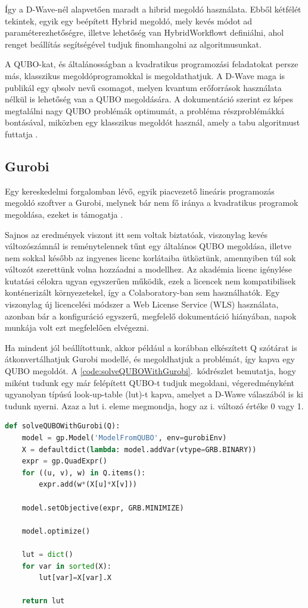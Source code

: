 Így a D-Wave-nél alapvetően maradt a hibrid megoldó használata. Ebből kétfélét tekintek, egyik egy beépített Hybrid megoldó, mely kevés módot ad paraméterezhetőségre, illetve lehetőség van HybridWorkflowt definiálni, ahol renget beállítás segítségével tudjuk finomhangolni az algoritmusunkat.


A QUBO-kat, és általánosságban a kvadratikus programozási feladatokat persze más, klasszikus megoldóprogramokkal is megoldathatjuk. A D-Wave maga is publikál egy qbsolv nevű csomagot, melyen kvantum erőforrások használata nélkül is lehetőség van a QUBO megoldására. A dokumentáció szerint ez képes megtalálni nagy QUBO problémák optimumát, a probléma részproblémákká bontásával, miközben egy klasszikus megoldót használ, amely a tabu algoritmust futtatja \cite{DWaveOceanQbsolv}. 

\subsection{Gurobi}\label{sec:Gurobi}

Egy kereskedelmi forgalomban lévő, egyik piacvezető lineáris programozás megoldó szoftver a Gurobi, melynek bár nem fő iránya a kvadratikus programok megoldása, ezeket is támogatja \cite{gurobi}. 

Sajnos az eredmények viszont itt sem voltak biztatóak, viszonylag kevés változószámnál is reménytelennek tűnt egy általános QUBO megoldása, illetve nem sokkal később az ingyenes licenc korlátaiba ütköztünk, amennyiben túl sok változót szerettünk volna hozzáadni a modellhez. Az akadémia licenc igénylése kutatási célokra ugyan egyszerűen működik, ezek a licencek nem kompatibilisek konténerizált környezetekel, így a Colaboratory-ban sem használhatók. Egy viszonylag új licencelési módszer a Web License Service (WLS) használata\cite{gurobiWLS}, azonban bár a konfiguráció egyszerű, megfelelő dokumentáció hiányában, napok munkája volt ezt megfelelően elvégezni\cite{gurobiAcademicColab}.

Ha mindent jól beállítottunk, akkor például a korábban elkészített Q szótárat is átkonvertálhatjuk Gurobi modellé, és megoldhatjuk a problémát, így kapva egy QUBO megoldót. A \ref{code:solveQUBOWithGurobi}.~kódrészlet bemutatja, hogy miként tudunk egy már felépített QUBO-t tudjuk megoldani, végeredményként ugyanolyan típúsú look-up-table (lut)-t kapva, amelyet a D-Wawe válaszából is ki tudunk nyerni. Azaz a lut i. eleme megmondja, hogy az i. változó értéke 0 vagy 1.

\begin{lstlisting}[language=python,caption=Max-cut QUBO,label=code:solveQUBOWithGurobi]	
def solveQUBOWithGurobi(Q):
	model = gp.Model('ModelFromQUBO', env=gurobiEnv)
	X = defaultdict(lambda: model.addVar(vtype=GRB.BINARY))
	expr = gp.QuadExpr()
	for ((u, v), w) in Q.items():
		expr.add(w*(X[u]*X[v]))
	
	model.setObjective(expr, GRB.MINIMIZE)
	
	model.optimize()
	
	lut = dict()
	for var in sorted(X):
		lut[var]=X[var].X
	
	return lut
	
\end{lstlisting}

